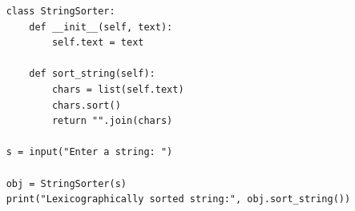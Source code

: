 \begin{verbatim}
    class StringSorter:
        def __init__(self, text):
            self.text = text
    
        def sort_string(self):
            chars = list(self.text)
            chars.sort()
            return "".join(chars)
    
    s = input("Enter a string: ")
    
    obj = StringSorter(s)
    print("Lexicographically sorted string:", obj.sort_string())
\end{verbatim}
